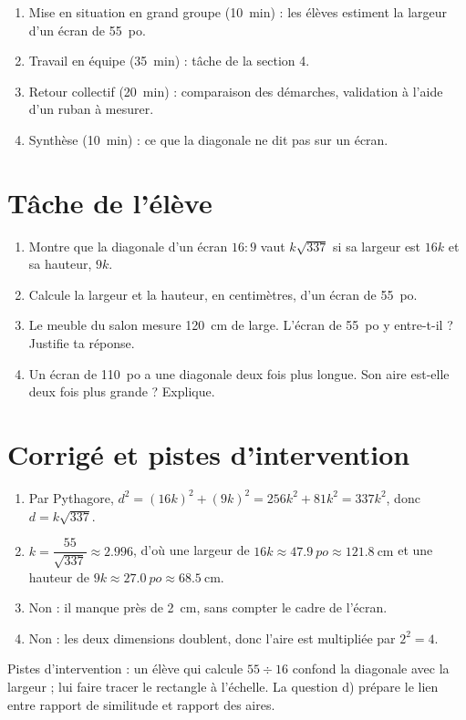 \documentclass[11pt]{article}
\begin{document}
\begin{enumerate}[label=\arabic*.]
  \item Mise en situation en grand groupe (\qty{10}{\minute}) :
    les élèves estiment la largeur d'un écran de \qty{55}{po}.
  \item Travail en équipe (\qty{35}{\minute}) : tâche de la section 4.
  \item Retour collectif (\qty{20}{\minute}) : comparaison des
    démarches, validation à l'aide d'un ruban à mesurer.
  \item Synthèse (\qty{10}{\minute}) : ce que la diagonale ne dit pas
    sur un écran.
\end{enumerate}

\section{Tâche de l'élève}

\begin{enumerate}[label=\alph*)]
  \item Montre que la diagonale d'un écran $16:9$ vaut
    $k\sqrt{337}$ si sa largeur est $16k$ et sa hauteur, $9k$.
  \item Calcule la largeur et la hauteur, en centimètres, d'un écran de
    \qty{55}{po}.
  \item Le meuble du salon mesure \qty{120}{\centi\metre} de large.
    L'écran de \qty{55}{po} y entre-t-il ? Justifie ta réponse.
  \item Un écran de \qty{110}{po} a une diagonale deux fois plus
    longue. Son aire est-elle deux fois plus grande ? Explique.
\end{enumerate}

\section{Corrigé et pistes d'intervention}

\begin{enumerate}[label=\alph*)]
  \item Par Pythagore,
    $d^2 = (16k)^2 + (9k)^2 = 256k^2 + 81k^2 = 337k^2$, donc
    $d = k\sqrt{337}$.
  \item $k = \dfrac{55}{\sqrt{337}} \approx \num{2,996}$, d'où une
    largeur de $16k \approx \qty{47,9}{po} \approx \qty{121,8}{\centi\metre}$
    et une hauteur de $9k \approx \qty{27,0}{po} \approx
    \qty{68,5}{\centi\metre}$.
  \item Non : il manque près de \qty{2}{\centi\metre}, sans compter le
    cadre de l'écran.
  \item Non : les deux dimensions doublent, donc l'aire est multipliée
    par $2^2 = 4$.
\end{enumerate}

\noindent Pistes d'intervention : un élève qui calcule $55 \div 16$
confond la diagonale avec la largeur ; lui faire tracer le rectangle à
l'échelle. La question d) prépare le lien entre rapport de similitude
et rapport des aires.
\end{document}

